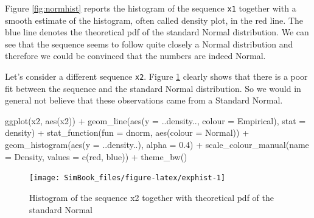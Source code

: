 \documentclass[
]{book}
\newenvironment{Shaded}{\begin{snugshade}}{\end{snugshade}}
\newcommand{\AttributeTok}[1]{\textcolor[rgb]{0.77,0.63,0.00}{#1}}
\newcommand{\FloatTok}[1]{\textcolor[rgb]{0.00,0.00,0.81}{#1}}
\newcommand{\FunctionTok}[1]{\textcolor[rgb]{0.00,0.00,0.00}{#1}}
\newcommand{\NormalTok}[1]{#1}
\newcommand{\SpecialCharTok}[1]{\textcolor[rgb]{0.00,0.00,0.00}{#1}}
\newcommand{\StringTok}[1]{\textcolor[rgb]{0.31,0.60,0.02}{#1}}
\begin{document}
Figure \ref{fig:normhist} reports the histogram of the sequence \texttt{x1} together with a smooth estimate of the histogram, often called density plot, in the red line. The blue line denotes the theoretical pdf of the standard Normal distribution. We can see that the sequence seems to follow quite closely a Normal distribution and therefore we could be convinced that the numbers are indeed Normal.

Let's consider a different sequence \texttt{x2}. Figure \ref{fig:exphist} clearly shows that there is a poor fit between the sequence and the standard Normal distribution. So we would in general not believe that these observations came from a Standard Normal.

\begin{Shaded}
\begin{Highlighting}[]
\FunctionTok{ggplot}\NormalTok{(x2, }\FunctionTok{aes}\NormalTok{(x2)) }\SpecialCharTok{+}
   \FunctionTok{geom\_line}\NormalTok{(}\FunctionTok{aes}\NormalTok{(}\AttributeTok{y =}\NormalTok{ ..density.., }\AttributeTok{colour =} \StringTok{\textquotesingle{}Empirical\textquotesingle{}}\NormalTok{), }\AttributeTok{stat =} \StringTok{\textquotesingle{}density\textquotesingle{}}\NormalTok{) }\SpecialCharTok{+}
   \FunctionTok{stat\_function}\NormalTok{(}\AttributeTok{fun =}\NormalTok{ dnorm, }\FunctionTok{aes}\NormalTok{(}\AttributeTok{colour =} \StringTok{\textquotesingle{}Normal\textquotesingle{}}\NormalTok{)) }\SpecialCharTok{+}      
   \FunctionTok{geom\_histogram}\NormalTok{(}\FunctionTok{aes}\NormalTok{(}\AttributeTok{y =}\NormalTok{ ..density..), }\AttributeTok{alpha =} \FloatTok{0.4}\NormalTok{) }\SpecialCharTok{+}      
   \FunctionTok{scale\_colour\_manual}\NormalTok{(}\AttributeTok{name =} \StringTok{\textquotesingle{}Density\textquotesingle{}}\NormalTok{, }\AttributeTok{values =} \FunctionTok{c}\NormalTok{(}\StringTok{\textquotesingle{}red\textquotesingle{}}\NormalTok{, }\StringTok{\textquotesingle{}blue\textquotesingle{}}\NormalTok{)) }\SpecialCharTok{+}
   \FunctionTok{theme\_bw}\NormalTok{()}
\end{Highlighting}
\end{Shaded}

\begin{figure}

{\centering \texttt{[image: SimBook\_files/figure-latex/exphist-1]} 

}

\caption{Histogram of the sequence x2 together with theoretical pdf of the standard Normal}\label{fig:exphist}
\end{figure}
\end{document}
